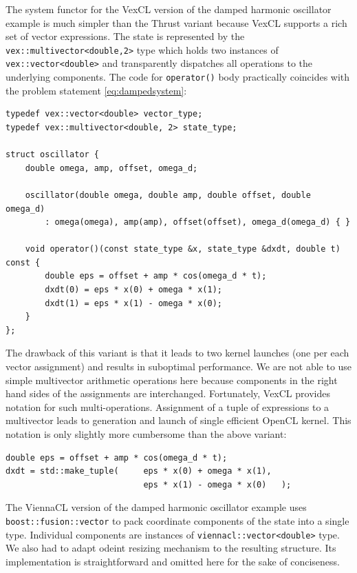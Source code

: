 \documentclass[1p]{elsarticle}
\newcommand{\code}[1]{\lstinline|#1|}
\begin{document}
The system functor for the VexCL version of the damped harmonic oscillator
example is much simpler than the Thrust variant because VexCL supports a rich
set of vector expressions. The state is represented by the
\code{vex::multivector<double,2>} type which holds two instances of
\code{vex::vector<double>} and transparently dispatches all operations to the
underlying components. The code for \code{operator()} body practically
coincides with the problem statement \eqref{eq:dampedsystem}: 
\begin{lstlisting}
typedef vex::vector<double> vector_type;
typedef vex::multivector<double, 2> state_type;

struct oscillator {
    double omega, amp, offset, omega_d;

    oscillator(double omega, double amp, double offset, double omega_d)
        : omega(omega), amp(amp), offset(offset), omega_d(omega_d) { }

    void operator()(const state_type &x, state_type &dxdt, double t) const {
        double eps = offset + amp * cos(omega_d * t);
        dxdt(0) = eps * x(0) + omega * x(1);
        dxdt(1) = eps * x(1) - omega * x(0);
    }
};
\end{lstlisting}


The drawback of this variant is that it leads
to two kernel launches (one per each vector assignment) and results in
suboptimal performance. We are not able to use simple multivector arithmetic
operations here because components in the right hand sides of the assignments
are interchanged.  Fortunately, VexCL provides notation for such
multi-operations.  Assignment of a tuple of expressions to a multivector leads
to generation and launch of single efficient OpenCL kernel. This notation is
only slightly more cumbersome than the above variant:
\begin{lstlisting}[firstnumber=11]
double eps = offset + amp * cos(omega_d * t);
dxdt = std::make_tuple(     eps * x(0) + omega * x(1),
                            eps * x(1) - omega * x(0)   );
\end{lstlisting}

The ViennaCL version of the damped harmonic oscillator example uses
\code{boost::fusion::vector} to pack coordinate components of the state into a
single type. Individual components are instances of
\code{viennacl::vector<double>} type. We also had to adapt odeint resizing
mechanism to the resulting structure. Its implementation is straightforward and
omitted here for the sake of conciseness.
\end{document}
